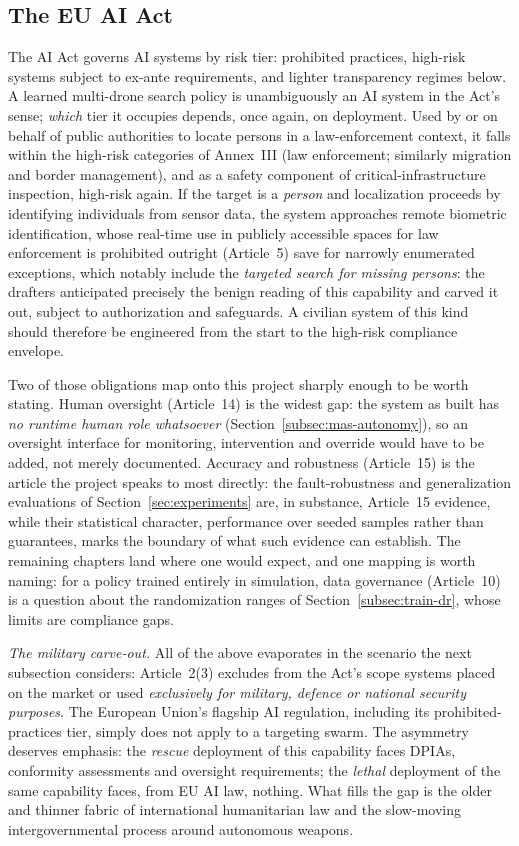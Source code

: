\subsection{The EU AI Act}
\label{subsec:eth-aiact}

The AI Act \citep{aiact2024} governs AI systems by risk tier: prohibited
practices, high-risk systems subject to ex-ante requirements, and lighter
transparency regimes below. A learned multi-drone search policy is unambiguously
an AI system in the Act's sense; \emph{which} tier it occupies depends, once
again, on deployment. Used by or on behalf of public authorities to locate
persons in a law-enforcement context, it falls within the high-risk categories of
Annex~III (law enforcement; similarly migration and border management), and as a
safety component of critical-infrastructure inspection, high-risk again. If the
target is a \emph{person} and localization proceeds by identifying individuals
from sensor data, the system approaches remote biometric identification, whose
real-time use in publicly accessible spaces for law enforcement is prohibited
outright (Article~5) save for narrowly enumerated exceptions, which notably
include the \emph{targeted search for missing persons}: the drafters anticipated
precisely the benign reading of this capability and carved it out, subject to
authorization and safeguards. A civilian system of this kind should therefore be
engineered from the start to the high-risk compliance envelope.

Two of those obligations map onto this project sharply enough to be worth
stating. Human oversight (Article~14) is the widest gap: the system as built has
\emph{no runtime human role whatsoever} (Section~\ref{subsec:mas-autonomy}), so
an oversight interface for monitoring, intervention and override would have to be
added, not merely documented. Accuracy and robustness (Article~15) is the article
the project speaks to most directly: the fault-robustness and generalization
evaluations of Section~\ref{sec:experiments} are, in substance, Article~15
evidence, while their statistical character, performance over seeded samples
rather than guarantees, marks the boundary of what such evidence can establish.
The remaining chapters land where one would expect, and one mapping is worth
naming: for a policy trained entirely in simulation, data governance
(Article~10) is a question about the randomization ranges of
Section~\ref{subsec:train-dr}, whose limits are compliance gaps.

\emph{The military carve-out.} All of the above evaporates in the scenario the
next subsection considers: Article~2(3) excludes from the Act's scope systems
placed on the market or used \emph{exclusively for military, defence or national
security purposes}. The European Union's flagship AI regulation, including its
prohibited-practices tier, simply does not apply to a targeting swarm. The
asymmetry deserves emphasis: the \emph{rescue} deployment of this capability
faces DPIAs, conformity assessments and oversight requirements; the
\emph{lethal} deployment of the same capability faces, from EU AI law, nothing.
What fills the gap is the older and thinner fabric of international humanitarian
law and the slow-moving intergovernmental process around autonomous weapons.

